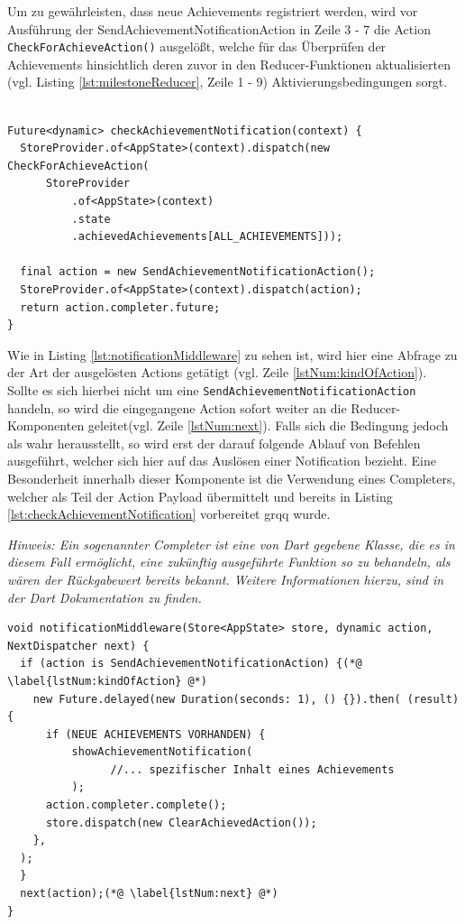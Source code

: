 \documentclass[bibliography=totoc,listof=totoc,BCOR=5mm,DIV=12,oneside]{scrbook}
\begin{document}
{\par \bigskip Um zu gewährleisten, dass neue Achievements registriert werden, wird vor Ausführung der SendAchievementNotificationAction in Zeile 3 - 7 die Action \texttt{CheckForAchieveAction()} ausgelößt, welche für das Überprüfen der Achievements hinsichtlich deren zuvor in den Reducer-Funktionen aktualisierten (vgl. Listing \ref{lst:milestoneReducer}, Zeile 1 - 9) Aktivierungsbedingungen sorgt.

\bigskip
\begin{lstlisting}[caption={Methode: checkAchievementNotification},captionpos=b, label=lst:checkAchievementNotification]

Future<dynamic> checkAchievementNotification(context) {
  StoreProvider.of<AppState>(context).dispatch(new CheckForAchieveAction(
      StoreProvider
          .of<AppState>(context)
          .state
          .achievedAchievements[ALL_ACHIEVEMENTS]));

  final action = new SendAchievementNotificationAction();
  StoreProvider.of<AppState>(context).dispatch(action);
  return action.completer.future;
}
\end{lstlisting}
\bigskip

\newpage
\par Wie in Listing \ref{lst:notificationMiddleware} zu sehen ist, wird hier eine Abfrage zu der Art der ausgelösten Actions getätigt (vgl. Zeile \ref{lstNum:kindOfAction}). Sollte es sich hierbei nicht um eine \texttt{SendAchievementNotificationAction} handeln, so wird die eingegangene Action sofort weiter an die Reducer-Komponenten geleitet(vgl. Zeile \ref{lstNum:next}). Falls sich die Bedingung jedoch als wahr herausstellt, so wird erst der darauf folgende Ablauf von Befehlen ausgeführt, welcher sich hier auf das Auslösen einer Notification bezieht. Eine Besonderheit innerhalb dieser Komponente ist die Verwendung eines Completers, welcher als Teil der Action Payload übermittelt und bereits in Listing \ref{lst:checkAchievementNotification} \grqq vorbereitet grqq{} wurde.

\par \bigskip \textit{Hinweis: Ein sogenannter Completer ist eine von Dart gegebene Klasse, die es in diesem Fall ermöglicht, eine zukünftig ausgeführte Funktion so zu behandeln, als wären der Rückgabewert bereits bekannt. Weitere Informationen hierzu, sind in der Dart Dokumentation zu finden.} \citep{DartCompleter}

\bigskip
\begin{lstlisting}[caption={Notification Middleware},captionpos=b, label=lst:notificationMiddleware]
void notificationMiddleware(Store<AppState> store, dynamic action, NextDispatcher next) { 
  if (action is SendAchievementNotificationAction) {(*@ \label{lstNum:kindOfAction} @*)
  	new Future.delayed(new Duration(seconds: 1), () {}).then( (result) {
      if (NEUE ACHIEVEMENTS VORHANDEN) {
          showAchievementNotification(
				//... spezifischer Inhalt eines Achievements       
          );
      action.completer.complete();
      store.dispatch(new ClearAchievedAction());
    },
  );
  }
  next(action);(*@ \label{lstNum:next} @*)
}
\end{lstlisting}
\bigskip

}
\end{document}
